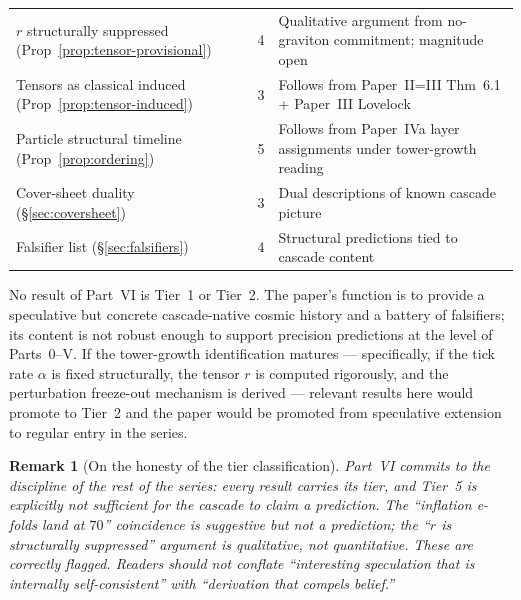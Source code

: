 \documentclass[12pt,a4paper]{article}
\newtheorem*{remark}{Remark}
\begin{document}
\begin{center}
\begin{tabular}{@{}>{\raggedright}p{6.5cm} c >{\raggedright\arraybackslash}p{6cm}@{}}
$r$ structurally suppressed (Prop~\ref{prop:tensor-provisional}) & 4 &
  Qualitative argument from no-graviton commitment; magnitude open \\
Tensors as classical induced (Prop~\ref{prop:tensor-induced}) & 3 &
  Follows from Paper~II=III Thm~6.1 + Paper~III Lovelock \\
Particle structural timeline (Prop~\ref{prop:ordering}) & 5 &
  Follows from Paper~IVa layer assignments under tower-growth reading \\
Cover-sheet duality (\S\ref{sec:coversheet}) & 3 &
  Dual descriptions of known cascade picture \\
Falsifier list (\S\ref{sec:falsifiers}) & 4 &
  Structural predictions tied to cascade content \\
\bottomrule
\end{tabular}
\end{center}

No result of Part~VI is Tier~1 or Tier~2. The paper's function is to provide
a speculative but concrete cascade-native cosmic history and a battery of
falsifiers; its content is not robust enough to support precision predictions
at the level of Parts~0--V. If the tower-growth identification matures ---
specifically, if the tick rate $\alpha$ is fixed structurally, the tensor $r$
is computed rigorously, and the perturbation freeze-out mechanism is derived
--- relevant results here would promote to Tier~2 and the paper would be
promoted from speculative extension to regular entry in the series.

\begin{remark}[On the honesty of the tier classification]
Part~VI commits to the discipline of the rest of the series: every result
carries its tier, and Tier~5 is explicitly not sufficient for the cascade to
claim a prediction. The ``inflation e-folds land at $70$'' coincidence is
suggestive but not a prediction; the ``$r$ is structurally suppressed''
argument is qualitative, not quantitative. These are correctly flagged.
Readers should not conflate ``interesting speculation that is internally
self-consistent'' with ``derivation that compels belief.''
\end{remark}
\end{document}
